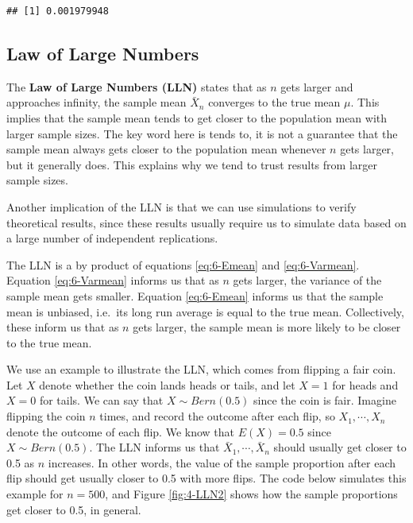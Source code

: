 \documentclass[
]{book}
\begin{document}
\begin{verbatim}
## [1] 0.001979948
\end{verbatim}

\subsection{Law of Large Numbers}\label{law-of-large-numbers}

The \textbf{Law of Large Numbers (LLN)} states that as \(n\) gets larger and approaches infinity, the sample mean \(\bar{X}_n\) converges to the true mean \(\mu\). This implies that the sample mean tends to get closer to the population mean with larger sample sizes. The key word here is tends to, it is not a guarantee that the sample mean always gets closer to the population mean whenever \(n\) gets larger, but it generally does. This explains why we tend to trust results from larger sample sizes.

Another implication of the LLN is that we can use simulations to verify theoretical results, since these results usually require us to simulate data based on a large number of independent replications.

The LLN is a by product of equations \eqref{eq:6-Emean} and \eqref{eq:6-Varmean}. Equation \eqref{eq:6-Varmean} informs us that as \(n\) gets larger, the variance of the sample mean gets smaller. Equation \eqref{eq:6-Emean} informs us that the sample mean is unbiased, i.e.~its long run average is equal to the true mean. Collectively, these inform us that as \(n\) gets larger, the sample mean is more likely to be closer to the true mean.

We use an example to illustrate the LLN, which comes from flipping a fair coin. Let \(X\) denote whether the coin lands heads or tails, and let \(X=1\) for heads and \(X=0\) for tails. We can say that \(X \sim Bern(0.5)\) since the coin is fair. Imagine flipping the coin \(n\) times, and record the outcome after each flip, so \(X_1, \cdots, X_n\) denote the outcome of each flip. We know that \(E(X) = 0.5\) since \(X \sim Bern(0.5)\). The LLN informs us that \(\bar{X}_1, \cdots, \bar{X}_n\) should usually get closer to 0.5 as \(n\) increases. In other words, the value of the sample proportion after each flip should get usually closer to 0.5 with more flips. The code below simulates this example for \(n=500\), and Figure \ref{fig:4-LLN2} shows how the sample proportions get closer to 0.5, in general.
\end{document}

